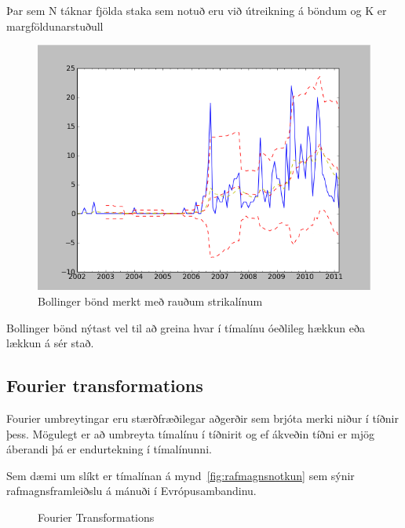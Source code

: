 \documentclass{article}
\begin{document}
Þar sem N táknar fjölda staka sem notuð eru við útreikning á böndum og K er margföldunarstuðull


\begin{figure}[H]
  \centering
  \includegraphics[width=.58\textwidth]{Bollinger.png} 
  \caption{Bollinger bönd merkt með rauðum strikalínum} 
\end{figure}


Bollinger bönd nýtast vel til að greina hvar í
tímalínu óeðlileg hækkun eða lækkun á sér stað.




\subsection{Fourier transformations} 

Fourier umbreytingar eru stærðfræðilegar aðgerðir sem brjóta merki niður í tíðnir þess. 
Mögulegt er að umbreyta tímalínu í tíðnirit og ef ákveðin tíðni er mjög áberandi 
þá er endurtekning í tímalínunni. 

Sem dæmi um slíkt er tímalínan á mynd~\ref{fig:rafmagnsnotkun} sem sýnir
rafmagnsframleiðslu á mánuði í Evrópusambandinu.


\begin{figure}[H]
  \centering 
      \caption{Fourier Transformations}
  \label{fig:fourier}
\end{figure}
\end{document}
